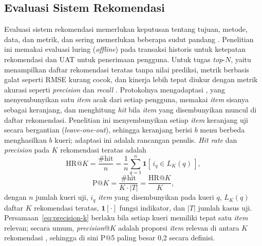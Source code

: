 \subsection{Evaluasi Sistem Rekomendasi}
\label{subsec:evaluasi-rekomendasi}

Evaluasi sistem rekomendasi memerlukan keputusan tentang tujuan, metode, data, dan metrik, dan sering memerlukan beberapa sudut pandang \citep*{zangerle2022evaluating}. Penelitian ini memakai evaluasi luring (\textit{offline}) pada transaksi historis untuk ketepatan rekomendasi dan UAT untuk penerimaan pengguna. Untuk tugas \textit{top}-$N$, yaitu menampilkan daftar rekomendasi teratas tanpa nilai prediksi, metrik berbasis galat seperti RMSE kurang cocok, dan kinerja lebih tepat diukur dengan metrik akurasi seperti \textit{precision} dan \textit{recall} \citep*{cremonesi2010performance}. Protokolnya mengadaptasi \citet*{deshpande2004itembased}, yang menyembunyikan satu \textit{item} acak dari setiap pengguna, memakai \textit{item} sisanya sebagai keranjang, dan menghitung \textit{hit} bila \textit{item} yang disembunyikan muncul di daftar rekomendasi. Penelitian ini menyembunyikan setiap \textit{item} keranjang uji secara bergantian (\textit{leave-one-out}), sehingga keranjang berisi $b$ menu berbeda menghasilkan $b$ kueri; adaptasi ini adalah rancangan penulis. \textit{Hit rate} dan \textit{precision} pada $K$ rekomendasi teratas adalah \citep*{deshpande2004itembased, cremonesi2010performance}
\begin{equation}
\mathrm{HR@}K = \frac{\#\mathrm{hit}}{n} = \frac{1}{n}\sum_{q=1}^{n} \mathbf{1}\left[\, i_q \in L_K(q) \,\right],
\label{eq:hr}
\end{equation}
\begin{equation}
\mathrm{P@}K = \frac{\#\mathrm{hit}}{K \cdot |T|} = \frac{\mathrm{HR@}K}{K},
\label{eq:precision-k}
\end{equation}
dengan $n$ jumlah kueri uji, $i_q$ \textit{item} yang disembunyikan pada kueri $q$, $L_K(q)$ daftar $K$ rekomendasi teratas, $\mathbf{1}[\cdot]$ fungsi indikator, dan $|T|$ jumlah kasus uji. Persamaan~\eqref{eq:precision-k} berlaku bila setiap kueri memiliki tepat satu \textit{item} relevan; secara umum, \textit{precision}@$K$ adalah proporsi \textit{item} relevan di antara $K$ rekomendasi \citep*{zangerle2022evaluating}, sehingga di sini P@5 paling besar 0,2 secara definisi.


